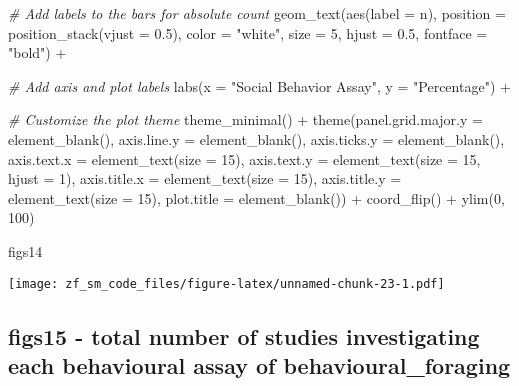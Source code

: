 \documentclass[
]{article}
\newenvironment{Shaded}{\begin{snugshade}}{\end{snugshade}}
\newcommand{\AttributeTok}[1]{\textcolor[rgb]{0.77,0.63,0.00}{#1}}
\newcommand{\CommentTok}[1]{\textcolor[rgb]{0.56,0.35,0.01}{\textit{#1}}}
\newcommand{\DecValTok}[1]{\textcolor[rgb]{0.00,0.00,0.81}{#1}}
\newcommand{\FloatTok}[1]{\textcolor[rgb]{0.00,0.00,0.81}{#1}}
\newcommand{\FunctionTok}[1]{\textcolor[rgb]{0.00,0.00,0.00}{#1}}
\newcommand{\NormalTok}[1]{#1}
\newcommand{\SpecialCharTok}[1]{\textcolor[rgb]{0.00,0.00,0.00}{#1}}
\newcommand{\StringTok}[1]{\textcolor[rgb]{0.31,0.60,0.02}{#1}}
\begin{document}
\begin{Shaded}
\begin{Highlighting}[]
  \CommentTok{\# Add labels to the bars for absolute count  }
  \FunctionTok{geom\_text}\NormalTok{(}\FunctionTok{aes}\NormalTok{(}\AttributeTok{label =}\NormalTok{ n), }\AttributeTok{position =} \FunctionTok{position\_stack}\NormalTok{(}\AttributeTok{vjust =} \FloatTok{0.5}\NormalTok{), }\AttributeTok{color =} \StringTok{"white"}\NormalTok{, }\AttributeTok{size =} \DecValTok{5}\NormalTok{, }\AttributeTok{hjust =} \FloatTok{0.5}\NormalTok{, }\AttributeTok{fontface =}   \StringTok{"bold"}\NormalTok{) }\SpecialCharTok{+}
  
  \CommentTok{\# Add axis and plot labels}
  \FunctionTok{labs}\NormalTok{(}\AttributeTok{x =} \StringTok{"Social Behavior Assay"}\NormalTok{, }\AttributeTok{y =} \StringTok{"Percentage"}\NormalTok{) }\SpecialCharTok{+}
  
  \CommentTok{\# Customize the plot theme}
  \FunctionTok{theme\_minimal}\NormalTok{() }\SpecialCharTok{+}
  \FunctionTok{theme}\NormalTok{(}\AttributeTok{panel.grid.major.y =} \FunctionTok{element\_blank}\NormalTok{(),}
    \AttributeTok{axis.line.y =} \FunctionTok{element\_blank}\NormalTok{(),}
    \AttributeTok{axis.ticks.y =} \FunctionTok{element\_blank}\NormalTok{(),}
    \AttributeTok{axis.text.x =} \FunctionTok{element\_text}\NormalTok{(}\AttributeTok{size =} \DecValTok{15}\NormalTok{),}
    \AttributeTok{axis.text.y =} \FunctionTok{element\_text}\NormalTok{(}\AttributeTok{size =} \DecValTok{15}\NormalTok{, }\AttributeTok{hjust =} \DecValTok{1}\NormalTok{),}
    \AttributeTok{axis.title.x =} \FunctionTok{element\_text}\NormalTok{(}\AttributeTok{size =} \DecValTok{15}\NormalTok{),}
    \AttributeTok{axis.title.y =} \FunctionTok{element\_text}\NormalTok{(}\AttributeTok{size =} \DecValTok{15}\NormalTok{),}
    \AttributeTok{plot.title =} \FunctionTok{element\_blank}\NormalTok{()) }\SpecialCharTok{+}
    \FunctionTok{coord\_flip}\NormalTok{() }\SpecialCharTok{+}
    \FunctionTok{ylim}\NormalTok{(}\DecValTok{0}\NormalTok{, }\DecValTok{100}\NormalTok{)}

\NormalTok{figs14}
\end{Highlighting}
\end{Shaded}

\texttt{[image: zf\_sm\_code\_files/figure-latex/unnamed-chunk-23-1.pdf]}

\hypertarget{figs15---total-number-of-studies-investigating-each-behavioural-assay-of-behavioural_foraging}{%
\subsection{figs15 - total number of studies investigating each
behavioural assay of
behavioural\_foraging}\label{figs15---total-number-of-studies-investigating-each-behavioural-assay-of-behavioural_foraging}}
\end{document}
